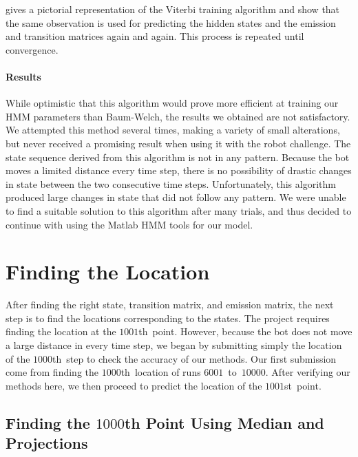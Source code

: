 \documentclass[twoside]{article}
\begin{document}
 gives a pictorial representation of the Viterbi training algorithm and show that the same observation is used for predicting the hidden states and the emission and transition matrices again and again.
This process is repeated until convergence.

\paragraph{Results}

While optimistic that this algorithm would prove more efficient at training our HMM parameters than Baum-Welch, the results we obtained are not satisfactory.
We attempted this method several times, making a variety of small alterations, but never received a promising result when using it with the robot challenge.
The state sequence derived from this algorithm is not in any pattern.
Because the bot moves a limited distance every time step, there is no possibility of drastic changes in state between the two consecutive time steps.
Unfortunately, this algorithm produced large changes in state that did not follow any pattern.
We were unable to find a suitable solution to this algorithm after many trials, and thus decided to continue with using the Matlab HMM tools for our model.

\section{Finding the Location}\label{sec:finding-the-locat}

After finding the right state, transition matrix, and emission matrix, the next step is to find the locations corresponding to the states.
The project requires finding the location at the $\num{1001}$th~point.
However, because the bot does not move a large distance in every time step, we began by submitting simply the location of the $\num{1000}$th~step to check the accuracy of our methods.
Our first submission come from finding the $\num{1000}$th~location of runs $\num{6001}$~to~$\num{10000}$.
After verifying our methods here, we then proceed to predict the location of the $\num{1001}$st~point.

\subsection{Finding the $\num{1000}$th Point Using Median and Projections}\label{sec:find-num1000th-point}
\end{document}
